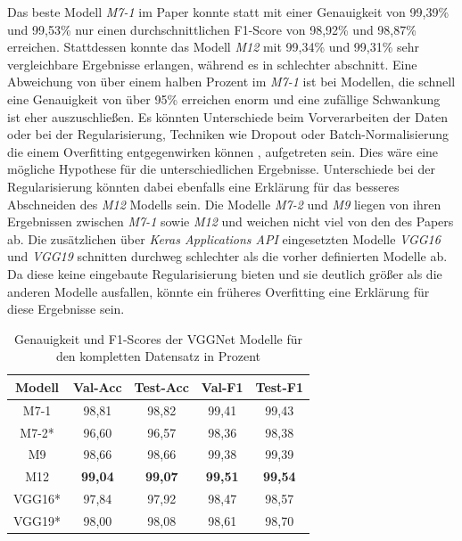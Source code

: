 \documentclass[twoside,a4paper]{IEEEtran}
\begin{document}
Das beste Modell \emph{M7-1} im Paper \cite{RHC} konnte statt mit einer Genauigkeit von 99,39\% und 99,53\% nur einen durchschnittlichen F1-Score von 98,92\% und 98,87\% erreichen. Stattdessen konnte das Modell \emph{M12} mit 99,34\% und 99,31\% sehr vergleichbare Ergebnisse erlangen, während es in \cite{RHC} schlechter abschnitt. Eine Abweichung von über einem halben Prozent im \emph{M7-1} ist bei Modellen, die schnell eine Genauigkeit von über 95\% erreichen enorm und eine zufällige Schwankung ist eher auszuschließen. Es könnten Unterschiede beim Vorverarbeiten der Daten oder bei der Regularisierung, Techniken wie Dropout oder Batch-Normalisierung die einem Overfitting entgegenwirken können \cite[S.27]{MACHINE_LEARNING}, aufgetreten sein. Dies wäre eine mögliche Hypothese für die unterschiedlichen Ergebnisse. Unterschiede bei der Regularisierung könnten dabei ebenfalls eine Erklärung für das besseres Abschneiden des \emph{M12} Modells sein. Die Modelle \emph{M7-2} und \emph{M9} liegen von ihren Ergebnissen zwischen \emph{M7-1} sowie \emph{M12} und weichen nicht viel von den des Papers \cite{RHC} ab. Die zusätzlichen über \emph{Keras Applications API} eingesetzten Modelle \emph{VGG16} und \emph{VGG19} schnitten durchweg schlechter als die vorher definierten Modelle ab. Da diese keine eingebaute Regularisierung bieten \cite{keras_vgg} und sie deutlich größer als die anderen Modelle ausfallen, könnte ein früheres Overfitting eine Erklärung für diese Ergebnisse sein.

\begin{table}[!htb]
	\caption{Genauigkeit und F1-Scores der VGGNet Modelle für den kompletten Datensatz in Prozent}
	\label{vgg_ergebnis_full}
	\centering
	\begin{tabular}{|c|c|c|c|c|}
		\hline
		Modell & Val-Acc & Test-Acc & Val-F1 & Test-F1\\
		\hline 
		\hline 
		M7-1 & 98,81 & 98,82 & 99,41 & 99,43\\
		\hline
		M7-2* & 96,60 & 96,57 & 98,36 & 98,38\\
		\hline
		M9 & 98,66 & 98,66 & 99,38 & 99,39\\
		\hline 
		M12 & \textbf{99,04} & \textbf{99,07} & \textbf{99,51} & \textbf{99,54}\\
		\hline 
		VGG16* & 97,84 & 97,92 & 98,47 & 98,57\\
		\hline 
		VGG19* & 98,00 & 98,08 & 98,61 & 98,70\\
		\hline 
	\end{tabular}
\end{table}
\end{document}
